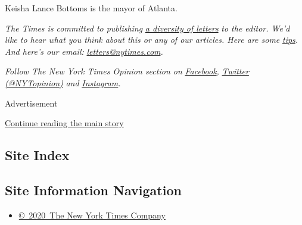 Keisha Lance Bottoms is the mayor of Atlanta.

\emph{The Times is committed to publishing}
\href{https://www.nytimes.com/2019/01/31/opinion/letters/letters-to-editor-new-york-times-women.html}{\emph{a
diversity of letters}} \emph{to the editor. We'd like to hear what you
think about this or any of our articles. Here are some}
\href{https://help.nytimes.com/hc/en-us/articles/115014925288-How-to-submit-a-letter-to-the-editor}{\emph{tips}}\emph{.
And here's our email:}
\href{mailto:letters@nytimes.com}{\emph{letters@nytimes.com}}\emph{.}

\emph{Follow The New York Times Opinion section on}
\href{https://www.facebook.com/nytopinion}{\emph{Facebook}}\emph{,}
\href{http://twitter.com/NYTOpinion}{\emph{Twitter (@NYTopinion)}}
\emph{and}
\href{https://www.instagram.com/nytopinion/}{\emph{Instagram}}\emph{.}

Advertisement

\protect\hyperlink{after-bottom}{Continue reading the main story}

\hypertarget{site-index}{%
\subsection{Site Index}\label{site-index}}

\hypertarget{site-information-navigation}{%
\subsection{Site Information
Navigation}\label{site-information-navigation}}

\begin{itemize}
\tightlist
\item
  \href{https://help.nytimes.com/hc/en-us/articles/115014792127-Copyright-notice}{©~2020~The
  New York Times Company}
\end{itemize}

